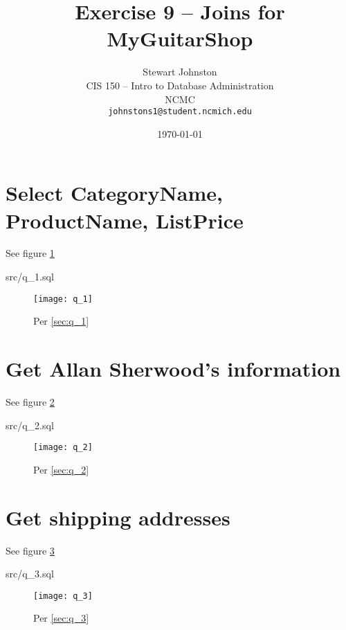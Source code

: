 \documentclass{article}
\title{Exercise 9 -- Joins for MyGuitarShop}
\author{Stewart Johnston\\
  {CIS 150 -- Intro to Database Administration}\\
  {NCMC}\\
  {\texttt{johnstons1@student.ncmich.edu}}
}
\date{\today}
\begin{document}

\maketitle

\tableofcontents
\listoffigures

\section{Select CategoryName, ProductName, ListPrice}
See figure \ref{fig:q_1}
\label{sec:q_1}
\begin{lstinputlisting}[float]{src/q_1.sql}
\end{lstinputlisting}
\begin{figure}[H]\centering
	\caption{Per \ref{sec:q_1}}
	\texttt{[image: q\_1]}
	\label{fig:q_1}
\end{figure}

\section{Get Allan Sherwood's information}
See figure \ref{fig:q_2}
\label{sec:q_2}
\begin{lstinputlisting}[float]{src/q_2.sql}
\end{lstinputlisting}
\begin{figure}[H]\centering
	\caption{Per \ref{sec:q_2}}
	\texttt{[image: q\_2]}
	\label{fig:q_2}
\end{figure}

\section{Get shipping addresses}
See figure \ref{fig:q_3}
\label{sec:q_3}
\begin{lstinputlisting}[float]{src/q_3.sql}
\end{lstinputlisting}
\begin{figure}[H]\centering
	\caption{Per \ref{sec:q_3}}
	\texttt{[image: q\_3]}
	\label{fig:q_3}
\end{figure}
\end{document}
